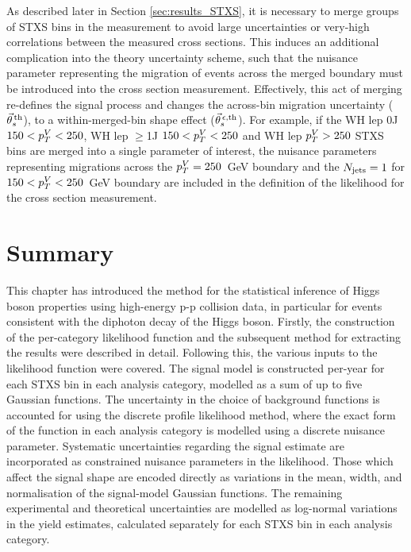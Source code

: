 As described later in Section \ref{sec:results_STXS}, it is necessary to merge groups of STXS bins in the measurement to avoid large uncertainties or very-high correlations between the measured cross sections. This induces an additional complication into the theory uncertainty scheme, such that the nuisance parameter representing the migration of events across the merged boundary must be introduced into the cross section measurement. Effectively, this act of merging re-defines the signal process and changes the across-bin migration uncertainty ($\vec{\theta}^{\,\rm{th}}_{s}$), to a within-merged-bin shape effect ($\vec{\theta}^{\,\epsilon,{\rm{th}}}_{s}$). For example, if the WH lep 0J $150<p_T^V<250$, WH lep $\geq$1J $150<p_T^V<250$ and WH lep $p_T^V>250$ STXS bins are merged into a single parameter of interest, the nuisance parameters representing migrations across the $p_T^V=250$~GeV boundary and the $N_{\rm{jets}}=1$ for $150<p_T^V<250$~GeV boundary are included in the definition of the likelihood for the cross section measurement.

\section{Summary}
This chapter has introduced the method for the statistical inference of Higgs boson properties using high-energy p-p collision data, in particular for events consistent with the diphoton decay of the Higgs boson. Firstly, the construction of the per-category likelihood function and the subsequent method for extracting the results were described in detail. Following this, the various inputs to the likelihood function were covered. The signal model is constructed per-year for each STXS bin in each analysis category, modelled as a sum of up to five Gaussian functions. The uncertainty in the choice of background functions is accounted for using the discrete profile likelihood method, where the exact form of the function in each analysis category is modelled using a discrete nuisance parameter. Systematic uncertainties regarding the signal estimate are incorporated as constrained nuisance parameters in the likelihood. Those which affect the signal shape are encoded directly as variations in the mean, width, and normalisation of the signal-model Gaussian functions. The remaining experimental and theoretical uncertainties are modelled as log-normal variations in the yield estimates, calculated separately for each STXS bin in each analysis category.
